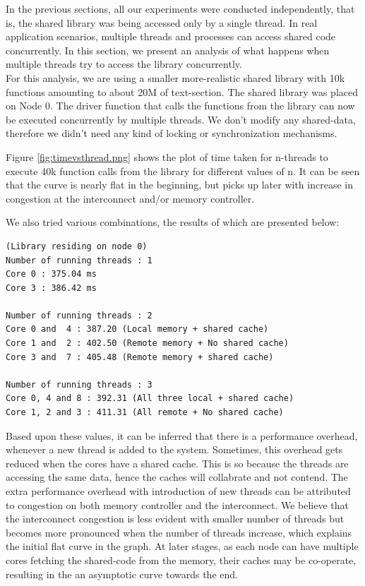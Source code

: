 In the previous sections, all our experiments were conducted independently, that is, the shared library
was being accessed only by a single thread. In real application scenarios, multiple threads and processes
can access shared code concurrently. In this section, we present an analysis of what happens when multiple
threads try to access the library concurrently.\\
For this analysis, we are using a smaller more-realistic shared library with 10k functions amounting to about 20M 
of text-section. The shared library was placed on Node 0. The driver function that calls the functions from 
the library can now be executed concurrently by multiple threads.
We don't modify any shared-data, therefore we didn't need any kind of locking or synchronization mechanisms.

Figure \ref{fig:timevsthread.png} shows the plot of time taken for n-threads to execute 40k function calls from
the library for different values of n. It can be seen that the curve is nearly flat in the beginning, but picks up
later with increase in congestion at the interconnect and/or memory controller.

We also tried various combinations, the results of which are presented below:
\begin{verbatim}
(Library residing on node 0)
Number of running threads : 1
Core 0 : 375.04 ms
Core 3 : 386.42 ms

Number of running threads : 2
Core 0 and  4 : 387.20 (Local memory + shared cache)
Core 1 and  2 : 402.50 (Remote memory + No shared cache)
Core 3 and  7 : 405.48 (Remote memory + shared cache)

Number of running threads : 3
Core 0, 4 and 8 : 392.31 (All three local + shared cache)
Core 1, 2 and 3 : 411.31 (All remote + No shared cache)
\end{verbatim}

Based upon these values, it can be inferred that there is a performance overhead, whenever a new thread is
added to the system. Sometimes, this overhead gets reduced when the cores have a shared cache. This is so because
the  threads are accessing the same data, hence the caches will collabrate and not contend. The extra performance
overhead with introduction of new threads can be attributed to congestion on both memory controller and the interconnect.
We believe that the interconnect congestion is less evident with smaller number of threads but becomes more pronounced
when the number of threads increase, which explains the initial flat curve in the graph. At later stages, as each node
can have multiple cores fetching the shared-code from the memory, their caches may be co-operate, resulting in the an
asymptotic curve towards the end.
